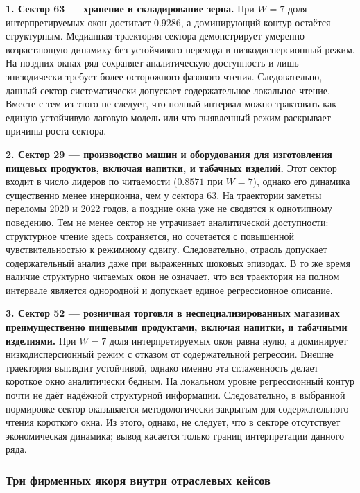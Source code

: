 \textbf{1. Сектор 63 --- хранение и складирование зерна.} При \(W=7\) доля интерпретируемых окон достигает 0.9286, а доминирующий контур остаётся структурным. Медианная траектория сектора демонстрирует умеренно возрастающую динамику без устойчивого перехода в низкодисперсионный режим. На поздних окнах ряд сохраняет аналитическую доступность и лишь эпизодически требует более осторожного фазового чтения. Следовательно, данный сектор систематически допускает содержательное локальное чтение. Вместе с тем из этого не следует, что полный интервал можно трактовать как единую устойчивую лаговую модель или что выявленный режим раскрывает причины роста сектора.

\textbf{2. Сектор 29 --- производство машин и оборудования для изготовления пищевых продуктов, включая напитки, и табачных изделий.} Этот сектор входит в число лидеров по читаемости (\(0.8571\) при \(W=7\)), однако его динамика существенно менее инерционна, чем у сектора 63. На траектории заметны переломы 2020 и 2022 годов, а поздние окна уже не сводятся к однотипному поведению. Тем не менее сектор не утрачивает аналитической доступности: структурное чтение здесь сохраняется, но сочетается с повышенной чувствительностью к режимному сдвигу. Следовательно, отрасль допускает содержательный анализ даже при выраженных шоковых эпизодах. В то же время наличие структурно читаемых окон не означает, что вся траектория на полном интервале является однородной и допускает единое регрессионное описание.

\textbf{3. Сектор 52 --- розничная торговля в неспециализированных магазинах преимущественно пищевыми продуктами, включая напитки, и табачными изделиями.} При \(W=7\) доля интерпретируемых окон равна нулю, а доминирует низкодисперсионный режим с отказом от содержательной регрессии. Внешне траектория выглядит устойчивой, однако именно эта сглаженность делает короткое окно аналитически бедным. На локальном уровне регрессионный контур почти не даёт надёжной структурной информации. Следовательно, в выбранной нормировке сектор оказывается методологически закрытым для содержательного чтения короткого окна. Из этого, однако, не следует, что в секторе отсутствует экономическая динамика; вывод касается только границ интерпретации данного ряда.

\subsubsection{Три фирменных якоря внутри отраслевых кейсов}
\label{sec:tri-firmennyh-yakorya-vnutri-otraslevyh-keisov}

